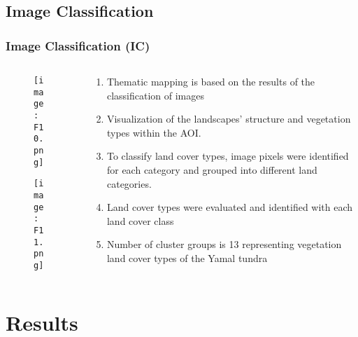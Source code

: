 \documentclass[pdflatex,compress,9pt,
	xcolor={dvipsnames,dvipsnames,svgnames,x11names,table},
	hyperref={colorlinks = true,breaklinks = true, urlcolor = NavyBlue, breaklinks = true}]{beamer}
\begin{document}
\subsection{Image Classification}
\begin{frame}\frametitle{Image Classification (IC)}
\begin{minipage}[0.4\textheight]{\textwidth}
\begin{columns}[T]
\begin{column}{0.5\textwidth}
\vspace{2em}
\begin{figure}[H]
	\centering
		\texttt{[image: F10.png]}
\end{figure}
\begin{figure}[H]
	\centering
		\texttt{[image: F11.png]}
\end{figure}
\end{column}
\begin{column}{0.5\textwidth}
\vspace{2em} 
\begin{enumerate}[{IC}-1]
            \item Thematic mapping is based on the results of the classification of images
            \item Visualization of the landscapes' structure and vegetation types within the AOI.
            \item To classify land cover types, image pixels were identified for each category and grouped into different land categories.
            \item Land cover types were evaluated and identified with each land cover class
            \item Number of cluster groups is 13 representing vegetation land cover types of the Yamal tundra
\end{enumerate}
\end{column}
\end{columns}
\end{minipage}
\end{frame}

\section{Results}
\end{document}
